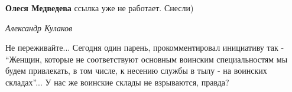 \begin{itemize}
\begin{itemize}
\textbf{Олеся Медведева} ссылка уже не работает. Снесли)

\end{itemize} %

\emph{Александр Кулаков}

Не переживайте... Сегодня один парень, прокомментировал инициативу так -
\enquote{Женщин, которые не соответствуют основным воинским специальностям мы
будем привлекать, в том числе, к несению службы в тылу - на воинских
складах}... У нас же воинские склады не взрываются, правда?

\end{itemize} %
